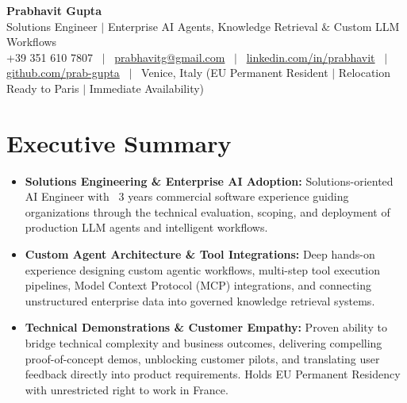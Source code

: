 \documentclass[a4paper,10pt]{article}
\begin{document}
\begin{minipage}[c]{0.80\textwidth}
  {\Huge\bfseries Prabhavit Gupta}\\[3pt]
  {\color{accent}\large Solutions Engineer $\vert$ Enterprise AI Agents, Knowledge Retrieval $\&$ Custom LLM Workflows}\\[6pt]
  {\footnotesize +39 351 610 7807 ~$\vert$~
  \href{mailto:prabhavitg@gmail.com}{prabhavitg@gmail.com} ~$\vert$~
  \href{https://www.linkedin.com/in/prabhavit/}{linkedin.com/in/prabhavit} ~$\vert$~
  \href{https://github.com/prab-gupta}{github.com/prab-gupta} ~$\vert$~
  Venice, Italy (EU Permanent Resident $\vert$ Relocation Ready to Paris $\vert$ Immediate Availability)}
\end{minipage}\hfill

\vspace{6pt}

\section{Executive Summary}
\begin{itemize}
  \item \textbf{Solutions Engineering \& Enterprise AI Adoption:} Solutions-oriented AI Engineer with ~3 years commercial software experience guiding organizations through the technical evaluation, scoping, and deployment of production LLM agents and intelligent workflows.
  \item \textbf{Custom Agent Architecture \& Tool Integrations:} Deep hands-on experience designing custom agentic workflows, multi-step tool execution pipelines, Model Context Protocol (MCP) integrations, and connecting unstructured enterprise data into governed knowledge retrieval systems.
  \item \textbf{Technical Demonstrations \& Customer Empathy:} Proven ability to bridge technical complexity and business outcomes, delivering compelling proof-of-concept demos, unblocking customer pilots, and translating user feedback directly into product requirements. Holds EU Permanent Residency with unrestricted right to work in France.
\end{itemize}

\end{document}
